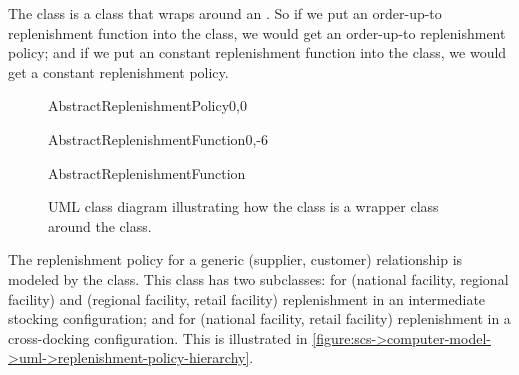 The class 
is a class that wraps around an .
So if we put an order-up-to replenishment function
into the  class,
we would get an order-up-to replenishment policy;
and if we put an constant replenishment function
into the  class,
we would get a constant replenishment policy.

\begin{figure}[h!]
\centering
\begin{myuml}
  \begin{abstractclass}[text width=10cm]{AbstractReplenishmentPolicy}{0,0}
  \end{abstractclass}

  \begin{abstractclass}[text width=10cm]{AbstractReplenishmentFunction}{0,-6}
  \end{abstractclass}
  
  {AbstractReplenishmentFunction}
\end{myuml}
\caption{UML class diagram illustrating how 
the \protect{} class
is a wrapper class around
the \protect{} class.}
\label{figure:scs->computer-model->uml->replenishment-policy}
\end{figure}





The replenishment policy for a generic (supplier, customer) relationship
is modeled by the  class.
This class has two subclasses:
for (national facility, regional facility)
and (regional facility, retail facility) replenishment
in an intermediate stocking configuration;
and 
for (national facility, retail facility) replenishment
in a cross-docking configuration.
This is illustrated in
\autoref{figure:scs->computer-model->uml->replenishment-policy-hierarchy}.

